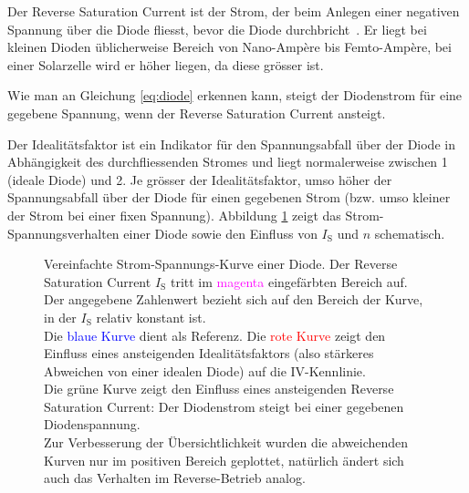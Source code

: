 Der   Reverse   Saturation  Current   ist   der   Strom,  der   beim   Anlegen
einer  negativen   Spannung  \"uber  die   Diode  fliesst,  bevor   die  Diode
durchbricht~\cite{ref:solar:diodeCharacteristics}.    Er  liegt   bei  kleinen
Dioden \"ublicherweise Bereich von Nano-Amp\`ere bis Femto-Amp\`ere, bei einer Solarzelle  wird er h\"oher
liegen, da diese gr\"osser ist.

Wie  man an  Gleichung \ref{eq:diode}  erkennen kann,  steigt der  Diodenstrom
f\"ur eine gegebene Spannung, wenn der Reverse Saturation Current ansteigt.

Der Idealit\"atsfaktor ist ein Indikator  f\"ur den Spannungsabfall \"uber der
Diode in  Abh\"angigkeit des durchfliessenden Stromes  und liegt normalerweise
zwischen  1  (ideale  Diode)   und  2. Je  gr\"osser  der  Idealit\"atsfaktor,
umso  h\"oher  der Spannungsabfall  \"uber  der  Diode f\"ur  einen  gegebenen
Strom  (bzw.  umso kleiner  der  Strom  bei einer  fixen  Spannung). Abbildung
\ref{fig:diodeVI:IS} zeigt das Strom-Spannungsverhalten  einer Diode sowie den
Einfluss von $I_{\mathrm{S}}$ und $n$ schematisch.

\begin{figure}[h!tb]
    
    \caption{%
        Vereinfachte Strom-Spannungs-Kurve einer Diode. Der Reverse Saturation
        Current   $I_{\mathrm{S}}$   tritt   im   \textcolor{magenta}{magenta}
        eingef\"arbten Bereich auf. Der angegebene Zahlenwert bezieht sich auf
        den  Bereich  der  Kurve,  in der  $I_{\mathrm{S}}$  relativ  konstant
        ist.\protect\\
        Die    \textcolor{blue}{blaue   Kurve}    dient   als    Referenz. Die
        \textcolor{red}{rote  Kurve}  zeigt  den Einfluss  eines  ansteigenden
        Idealit\"atsfaktors  (also  st\"arkeres  Abweichen von  einer  idealen
        Diode) auf die IV-Kennlinie.\protect\\
        Die \textcolor{green!50!black}{gr\"une Kurve} zeigt den Einfluss eines
        ansteigenden  Reverse Saturation  Current: Der Diodenstrom  steigt bei
        einer gegebenen Diodenspannung.\protect\\
        Zur  Verbesserung  der  \"Ubersichtlichkeit  wurden  die  abweichenden
        Kurven nur  im positiven Bereich geplottet,  nat\"urlich \"andert sich
        auch das Verhalten im Reverse-Betrieb analog.%
    }
    \label{fig:diodeVI:IS}
\end{figure}

